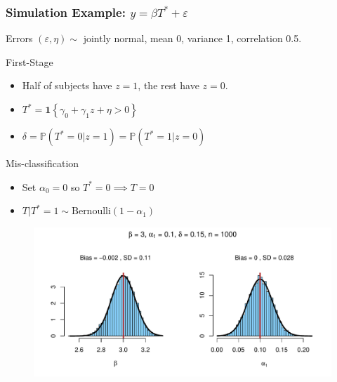 \documentclass{beamer}
\begin{document}
\begin{frame}
  \frametitle{Simulation Example: $y = \beta T^* + \varepsilon$}
  \begin{block}{Errors}
      $(\varepsilon, \eta) \sim $ jointly normal, mean 0, variance 1, correlation 0.5.
  \end{block}
  \begin{block}{First-Stage}
      \begin{itemize}
        \item Half of subjects have $z=1$, the rest have $z=0$.
        \item $T^* = \mathbf{1}\left\{ \gamma_0 + \gamma_1 z + \eta > 0 \right\}$
        \item $\delta = \mathbb{P}(T^* = 0|z =1) = \mathbb{P}(T^*=1|z=0)$
      \end{itemize}
  \end{block}
  \vspace{-1em}


  \begin{block}{Mis-classification}
      \begin{itemize}
        \item Set $\alpha_0 = 0$ so $T^* = 0 \implies T=0$
        \item $T|T^*=1 \sim \mbox{Bernoulli}(1-\alpha_1)$
      \end{itemize}
  \end{block}
  
\end{frame}
\begin{frame}[plain,c]

  \begin{figure}[h]
    \centering
    \includegraphics[width=\textwidth]{Rplot1}
  \end{figure}

\end{frame}
\end{document}
